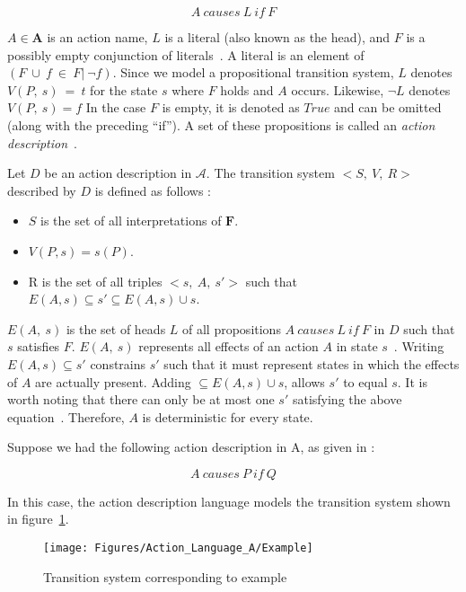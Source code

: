 $$
A\ causes\ L\ if\ F
$$

$ A \in \boldsymbol{A} $ is an action name, $ L $ is a literal (also known as the head), and $ F $ is a possibly empty conjunction of literals~\cite{gelfond_action_1998}.
A literal is an element of $(F\ \cup\ {f\ \in\ F |\ \neg f})$.
Since we model a propositional transition system, $L$ denotes $V(P,\ s)\ =\ t$ for the state $s$ where $F$ holds and $A$ occurs.
Likewise, $\neg L$ denotes $V(P,\ s)=f$
In the case $ F $ is empty, it is denoted as $ True $ and can be omitted (along with the preceding ``if'').
A set of these propositions is called an \textit{action description}~\cite{gelfond_action_1998}.

\begin{definition}
    Let $ D $ be an action description in $ \mathcal{A} $.
    The transition system $ <S,\ V,\ R> $ described by $ D $ is defined as follows \cite{gelfond_action_1998}:

    \begin{itemize}
        \item $ S $ is the set of all interpretations of $ \boldsymbol{F} $.
        \item $ V(P, s) = s(P) $.
        \item R is the set of all triples $ <s,\ A,\ s'> $ such that $ E(A,s) \subseteq s' \subseteq E(A,s) \cup s $.
    \end{itemize}
\end{definition}

$ E(A,\ s) $ is the set of heads $ L $ of all propositions $ A\ causes\ L\ if\ F $ in $ D $ such that $ s $ satisfies $ F $.
$ E(A,\ s) $ represents all effects of an action $ A $ in state $ s $~\cite{gelfond_action_1998}.
Writing $ E\left(A,s\right)\subseteq s' $ constrains $ s' $ such that it must represent states in which the effects of $ A $ are actually present.
Adding $ \subseteq E\left(A,s\right)\cup s $, allows $ s' $ to equal $ s $.
It is worth noting that there can only be at most one $ s' $ satisfying the above equation~\cite{gelfond_action_1998}.
Therefore, $ A $ is deterministic for every state.

Suppose we had the following action description in A, as given in \cite{gelfond_action_1998}:

$$
A\ causes\ P\ if\ Q
$$

In this case, the action description language models the transition system shown in figure~\ref{fig:action_language_a_example}.

\begin{figure}[h]
    \centering
    \texttt{[image: Figures/Action\_Language\_A/Example]}
    \caption{Transition system corresponding to example}
    \label{fig:action_language_a_example}
\end{figure}

